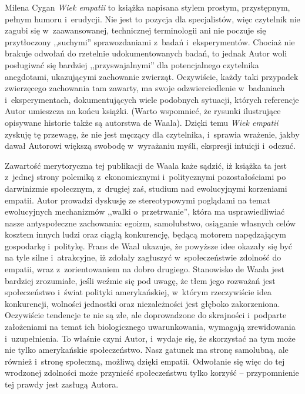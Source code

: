 \begin{recplenv}{Milena Cygan}
\textit{Wiek empatii} to książka napisana stylem prostym, przystępnym, pełnym humoru i~erudycji. Nie jest to pozycja dla
specjalistów, więc czytelnik nie zagubi się w~zaawansowanej, technicznej terminologii ani nie poczuje się przytłoczony
,,suchymi'' sprawozdaniami z~badań i~eksperymentów. Chociaż nie brakuje odwołań do rzetelnie udokumentowanych badań, to
jednak Autor woli posługiwać się bardziej ,,przyswajalnymi'' dla potencjalnego czytelnika anegdotami, ukazującymi
zachowanie zwierząt. Oczywiście, każdy taki przypadek zwierzęcego zachowania tam zawarty, ma swoje
odzwierciedlenie w~badaniach i~eksperymentach, dokumentujących wiele podobnych sytuacji, których referencje Autor umieszcza na końcu
książki. (Warto wspomnieć, że rysunki ilustrujące opisywane historie także są autorstwa de Waala). Dzięki temu
\textit{Wiek empatii} zyskuję tę przewagę, że nie jest męczący dla czytelnika, i~sprawia wrażenie, jakby dawał Autorowi
większą swobodę w~wyrażaniu myśli, ekspresji intuicji i~odczuć.

Zawartość merytoryczna tej publikacji de Waala każe sądzić, iż książka ta jest z~jednej strony
polemiką z~ekonomicznymi i~politycznymi pozostałościami po darwinizmie
społecznym, z~drugiej zaś, studium nad ewolucyjnymi korzeniami empatii.
Autor prowadzi dyskusję ze stereotypowymi poglądami na temat ewolucyjnych mechanizmów ,,walki o~przetrwanie'', która ma
usprawiedliwiać nasze antyspołeczne zachowania: egoizm, samolubstwo, osiąganie własnych celów kosztem innych ludzi oraz
ciągłą konkurencję, będącą motorem napędzającym gospodarkę i~politykę. Frans de Waal ukazuje, że powyższe idee okazały
się być na tyle silne i~atrakcyjne, iż zdołały zagłuszyć w~społeczeństwie zdolność do empatii, wraz z~zorientowaniem na
dobro drugiego. Stanowisko de Waala jest bardziej zrozumiałe, jeśli weźmie się pod uwagę, że tłem jego rozważań jest
społeczeństwo i~świat polityki amerykańskiej, w~którym rzeczywiście idea konkurencji, wolności jednostki oraz
niezależności jest głęboko zakorzeniona. Oczywiście tendencje te nie są złe, ale doprowadzone do skrajności i~podparte
założeniami na temat ich biologicznego uwarunkowania, wymagają zrewidowania i~uzupełnienia. To właśnie czyni
Autor, i~wydaje się, że skorzystać na tym może nie tylko amerykańskie społeczeństwo. Nasz gatunek ma stronę samolubną, ale
również i~stronę społeczną, możliwą dzięki empatii. Odwołanie się więc do tej wrodzonej zdolności może przynieść
społeczeństwu tylko korzyść -- przypomnienie tej prawdy jest zasługą Autora.


\end{recplenv}
